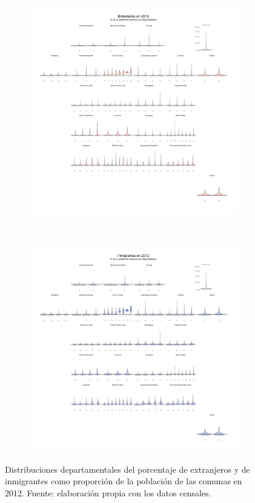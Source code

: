 \begin{figure}[h]
	\centering
	\begin{subfigure}{0.45\textwidth}
	\includegraphics[width = \textwidth]{Figs/AED/Geofacet_Distr_por_Dpto_Ext_2012}
	\end{subfigure}
	~
	\begin{subfigure}{0.45\textwidth}
	\includegraphics[width = \textwidth]{Figs/AED/Geofacet_Distr_por_Dpto_Inm_2012}
	\end{subfigure}
	\caption{Distribuciones departamentales del porcentaje de extranjeros y de inmigrantes como proporción de la población de las comunas en 2012. Fuente: elaboración propia con los datos censales.}
	\label{fig:Distr_por_Dpto_Nac_Inm_2012}	
\end{figure}

